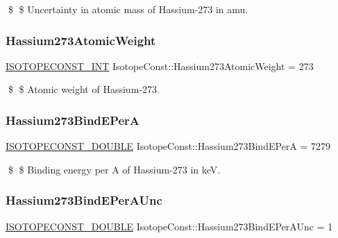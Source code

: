 \$ \$ Uncertainty in atomic mass of Hassium-\/273 in amu. \mbox{\label{group___isotope_const-_hassium-_hs273_ga077ac7d68df640ccafbbda163e237ad9}} 
\subsubsection{\texorpdfstring{Hassium273\+Atomic\+Weight}{Hassium273AtomicWeight}}
{\footnotesize\ttfamily \mbox{\hyperlink{group___isotope_const-_macros_ga5f18360b3e99483a35c32d789e62621c}{I\+S\+O\+T\+O\+P\+E\+C\+O\+N\+S\+T\+\_\+\+I\+NT}} Isotope\+Const\+::\+Hassium273\+Atomic\+Weight = 273}

\$ \$ Atomic weight of Hassium-\/273. \mbox{\label{group___isotope_const-_hassium-_hs273_gaac45c6e5ef876658c3a58dd26518bad1}} 
\subsubsection{\texorpdfstring{Hassium273\+Bind\+E\+PerA}{Hassium273BindEPerA}}
{\footnotesize\ttfamily \mbox{\hyperlink{group___isotope_const-_macros_ga8f45a7272ce02c0b4c65c44636ed719a}{I\+S\+O\+T\+O\+P\+E\+C\+O\+N\+S\+T\+\_\+\+D\+O\+U\+B\+LE}} Isotope\+Const\+::\+Hassium273\+Bind\+E\+PerA = 7279}

\$ \$ Binding energy per A of Hassium-\/273 in keV. \mbox{\label{group___isotope_const-_hassium-_hs273_ga3e56754345325316330b738328d8291d}} 
\subsubsection{\texorpdfstring{Hassium273\+Bind\+E\+Per\+A\+Unc}{Hassium273BindEPerAUnc}}
{\footnotesize\ttfamily \mbox{\hyperlink{group___isotope_const-_macros_ga8f45a7272ce02c0b4c65c44636ed719a}{I\+S\+O\+T\+O\+P\+E\+C\+O\+N\+S\+T\+\_\+\+D\+O\+U\+B\+LE}} Isotope\+Const\+::\+Hassium273\+Bind\+E\+Per\+A\+Unc = 1}

